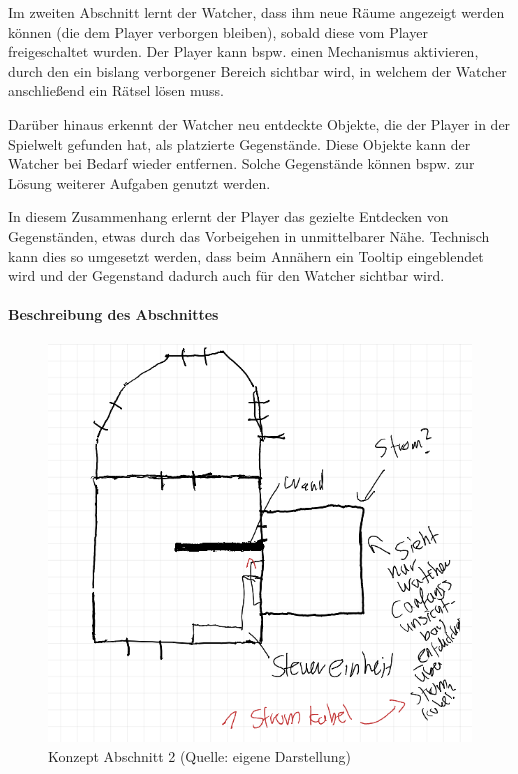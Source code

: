 Im zweiten Abschnitt lernt der Watcher, dass ihm neue Räume angezeigt werden können (die dem Player verborgen bleiben), sobald diese vom Player freigeschaltet wurden. Der Player kann bspw. einen Mechanismus aktivieren, durch den ein bislang verborgener Bereich sichtbar wird, in welchem der Watcher anschließend ein Rätsel lösen muss.

Darüber hinaus erkennt der Watcher neu entdeckte Objekte, die der Player in der Spielwelt gefunden hat, als platzierte Gegenstände. Diese Objekte kann der Watcher bei Bedarf wieder entfernen. Solche Gegenstände können bspw. zur Lösung weiterer Aufgaben genutzt werden.

In diesem Zusammenhang erlernt der Player das gezielte Entdecken von Gegenständen, etwas durch das Vorbeigehen in unmittelbarer Nähe. Technisch kann dies so umgesetzt werden, dass beim Annähern ein Tooltip eingeblendet wird und der Gegenstand dadurch auch für den Watcher sichtbar wird.

\paragraph{Beschreibung des Abschnittes}

\begin{figure}[ht]
\centering
\includegraphics[width=1\linewidth]{content/pictures/Abschnitt_Concept_01.PNG}
\caption{Konzept Abschnitt 2 (Quelle: eigene Darstellung)}
\label{fig:section_01_concept}
\end{figure}

